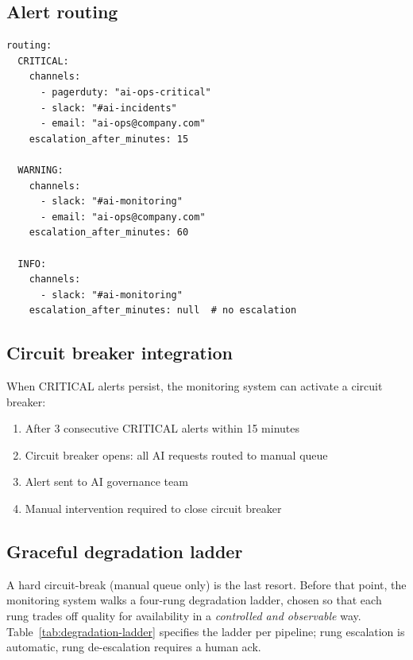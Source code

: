 \subsection{Alert routing}

\begin{lstlisting}[basicstyle=\ttfamily\small,caption={Alert routing configuration.}]
routing:
  CRITICAL:
    channels:
      - pagerduty: "ai-ops-critical"
      - slack: "#ai-incidents"
      - email: "ai-ops@company.com"
    escalation_after_minutes: 15
    
  WARNING:
    channels:
      - slack: "#ai-monitoring"
      - email: "ai-ops@company.com"
    escalation_after_minutes: 60
    
  INFO:
    channels:
      - slack: "#ai-monitoring"
    escalation_after_minutes: null  # no escalation
\end{lstlisting}

\subsection{Circuit breaker integration}

When CRITICAL alerts persist, the monitoring system can activate a circuit
breaker:

\begin{enumerate}
  \item After 3 consecutive CRITICAL alerts within 15 minutes
  \item Circuit breaker opens: all AI requests routed to manual queue
  \item Alert sent to AI governance team
  \item Manual intervention required to close circuit breaker
\end{enumerate}

\subsection{Graceful degradation ladder}
\label{sec:degradation-ladder}

A hard circuit-break (manual queue only) is the last resort. Before
that point, the monitoring system walks a four-rung degradation
ladder, chosen so that each rung trades off quality for availability
in a \emph{controlled and observable} way.
Table~\ref{tab:degradation-ladder} specifies the ladder per
pipeline; rung escalation is automatic, rung de-escalation requires
a human ack.

